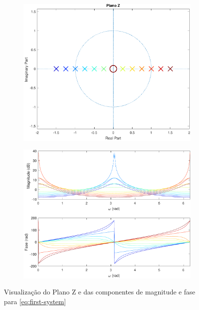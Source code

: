 \documentclass[a4paper,11pt]{article}
\numberwithin{figure}{section}
\numberwithin{equation}{section}
\numberwithin{table}{section}
\theoremstyle{definition}
\begin{document}
\begin{figure}[ht]
	\centering
	\begin{subfigure}{0.49\textwidth}
		\includegraphics[width=\textwidth]{ex_1_pz}
	\end{subfigure}
	\begin{subfigure}{0.49\textwidth}
		\includegraphics[width=\textwidth]{ex_1_bode}
	\end{subfigure}
		
	\caption{Visualizaç\~ao do Plano Z e das componentes de magnitude e fase para \eqref{eq:first-system}}
	\label{fig:01}
\end{figure}
\end{document}

